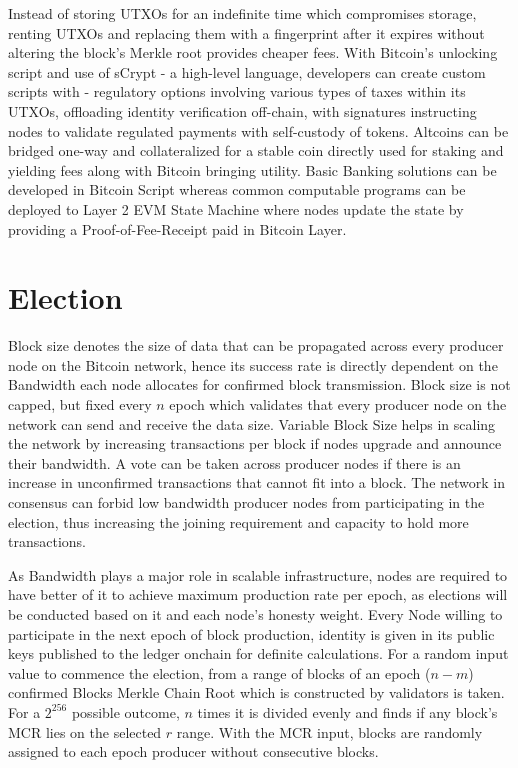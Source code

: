 \documentclass[a4paper,10pt]{article}
\begin{document}
Instead of storing UTXOs for an indefinite time which compromises storage, renting UTXOs and replacing them with a fingerprint after it expires without altering the block's Merkle root provides cheaper fees. With Bitcoin's unlocking script and use of sCrypt - a high-level language, developers can create custom scripts with - regulatory options involving various types of taxes within its UTXOs, offloading identity verification off-chain, with signatures instructing nodes to validate regulated payments with self-custody of tokens. Altcoins can be bridged one-way and collateralized for a stable coin directly used for staking and yielding fees along with Bitcoin bringing utility. Basic Banking solutions can be developed in Bitcoin Script whereas common computable programs can be deployed to Layer 2 EVM State Machine where nodes update the state by providing a Proof-of-Fee-Receipt paid in Bitcoin Layer. 
\section{Election}
Block size denotes the size of data that can be propagated across every producer node on the Bitcoin network, hence its success rate is directly dependent on the Bandwidth each node allocates for confirmed block transmission. Block size is not capped, but fixed every $n$ epoch which validates that every producer node on the network can send and receive the data size. Variable Block Size helps in scaling the network by increasing transactions per block if nodes upgrade and announce their bandwidth. A vote can be taken across producer nodes if there is an increase in unconfirmed transactions that cannot fit into a block. The network in consensus can forbid low bandwidth producer nodes from participating in the election, thus increasing the joining requirement and capacity to hold more transactions. 

As Bandwidth plays a major role in scalable infrastructure, nodes are required to have better of it to achieve maximum production rate per epoch, as elections will be conducted based on it and each node's honesty weight. Every Node willing to participate in the next epoch of block production, identity is given in its public keys published to the ledger onchain for definite calculations. For a random input value to commence the election, from a range of blocks of an epoch ($n-m$) confirmed Blocks Merkle Chain Root which is constructed by validators is taken. For a $2^{256}$ possible outcome, $n$ times it is divided evenly and finds if any block's MCR lies on the selected $r$ range. With the MCR input, blocks are randomly assigned to each epoch producer without consecutive blocks. 
\end{document}
